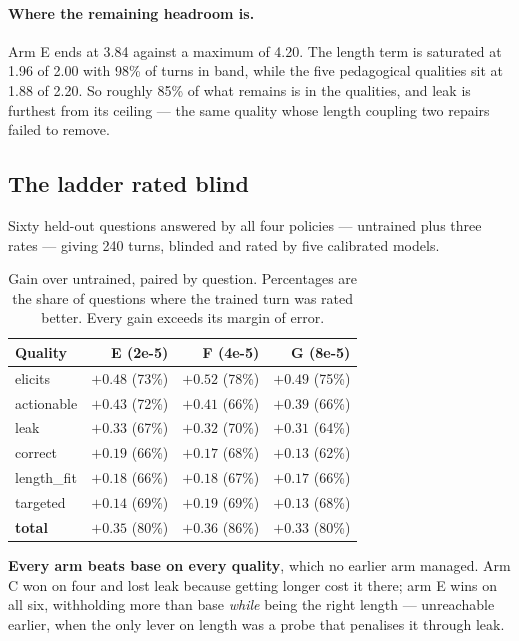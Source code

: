 \documentclass[11pt]{article}
\newcommand{\qual}[1]{\textsf{#1}}
\begin{document}
\paragraph{Where the remaining headroom is.} Arm E ends at 3.84 against a maximum of 4.20. The length term
is saturated at 1.96 of 2.00 with 98\% of turns in band, while the five pedagogical qualities sit at 1.88
of 2.20. So roughly 85\% of what remains is in the qualities, and \qual{leak} is furthest from its ceiling
--- the same quality whose length coupling two repairs failed to remove.

\subsection{The ladder rated blind}

Sixty held-out questions answered by all four policies --- untrained plus three rates --- giving 240 turns,
blinded and rated by five calibrated models.

\begin{table}[h]
\centering
\begin{tabular}{lrrr}
\toprule
\textbf{Quality} & \textbf{E (2e-5)} & \textbf{F (4e-5)} & \textbf{G (8e-5)} \\
\midrule
\qual{elicits}     & $+0.48$ (73\%) & $+0.52$ (78\%) & $+0.49$ (75\%) \\
\qual{actionable}  & $+0.43$ (72\%) & $+0.41$ (66\%) & $+0.39$ (66\%) \\
\qual{leak}        & $+0.33$ (67\%) & $+0.32$ (70\%) & $+0.31$ (64\%) \\
\qual{correct}     & $+0.19$ (66\%) & $+0.17$ (68\%) & $+0.13$ (62\%) \\
\qual{length\_fit} & $+0.18$ (66\%) & $+0.18$ (67\%) & $+0.17$ (66\%) \\
\qual{targeted}    & $+0.14$ (69\%) & $+0.19$ (69\%) & $+0.13$ (68\%) \\
\midrule
\textbf{total}     & $\mathbf{+0.35}$ (80\%) & $\mathbf{+0.36}$ (86\%) & $\mathbf{+0.33}$ (80\%) \\
\bottomrule
\end{tabular}
\caption{Gain over untrained, paired by question. Percentages are the share of questions where the trained
turn was rated better. Every gain exceeds its margin of error.}
\label{tab:ladderblind}
\end{table}

\textbf{Every arm beats base on every quality}, which no earlier arm managed. Arm C won on four and lost
\qual{leak} because getting longer cost it there; arm E wins on all six, withholding more than base
\emph{while} being the right length --- unreachable earlier, when the only lever on length was a probe that
penalises it through \qual{leak}.
\end{document}
